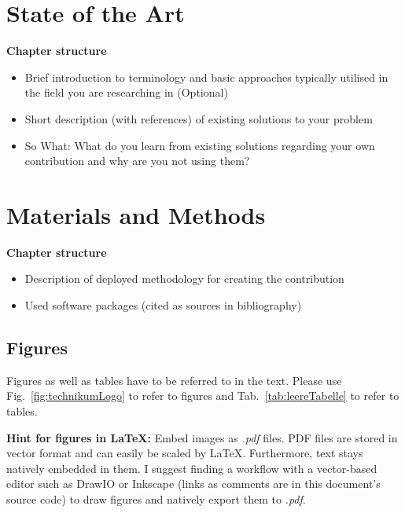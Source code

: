 \documentclass[conference]{IEEEtran}
\begin{document}
\color{blindtext}\blindtext\color{black}

\section{State of the Art}

\color{structure}
\textbf{Chapter structure}
\begin{itemize}
    \item Brief introduction to terminology and basic approaches typically utilised in the field you are researching in (Optional)
    \item Short description (with references) of existing solutions to your problem
    \item So What: What do you learn from existing solutions regarding your own contribution and why are you not using them?
\end{itemize}
\color{black}

\color{blindtext}\blindtext\blindtext\vspace{\baselineskip}\blindtext\color{black}

\section{Materials and Methods}

\color{structure}
\textbf{Chapter structure}
\begin{itemize}
    \item Description of deployed methodology for creating the contribution 
    \item Used software packages (cited as sources in bibliography)
\end{itemize}
\color{black}

\subsection{Figures}
Figures as well as tables have to be referred to in the text. Please use Fig.~\ref{fig:technikumLogo} to refer to figures and Tab.~\ref{tab:leereTabelle} to refer to tables.


\vspace{\baselineskip}
\textbf{Hint for figures in LaTeX:} Embed images as \textit{.pdf} files. PDF files are stored in vector format and can easily be scaled by LaTeX. Furthermore, text stays natively embedded in them. I suggest finding a workflow with a vector-based editor such as DrawIO or Inkscape (links as comments are in this document's source code) to draw figures and natively export them to \textit{.pdf}.
\end{document}
